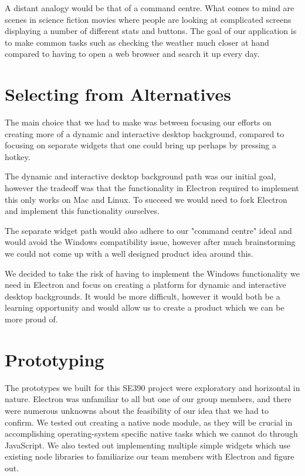 \documentclass[11pt, oneside]{article}   	%
\begin{document}
A distant analogy would be that of a command centre.  What comes to mind are
scenes in science fiction movies where people are looking at complicated screens
displaying a number of different stats and buttons.  The goal of our application
is to make common tasks such as checking the weather much closer at hand
compared to having to open a web browser and search it up every day.

\section{Selecting from Alternatives}
The main choice that we had to make was between focusing our efforts on creating
more of a dynamic and interactive desktop background, compared to focusing on
separate widgets that one could bring up perhaps by pressing a hotkey.

The dynamic and interactive desktop background path was our initial goal,
however the tradeoff was that the functionality in Electron required to
implement this only works on Mac and Linux.  To succeed we would need to fork
Electron and implement this functionality ourselves.

The separate widget path would also adhere to our "command centre" ideal and
would avoid the Windows compatibility issue, however after much brainstorming we
could not come up with a well designed product idea around this.

We decided to take the risk of having to implement the Windows functionality we
need in Electron and focus on creating a platform for dynamic and interactive
desktop backgrounds.  It would be more difficult, however it would both be a
learning opportunity and would allow us to create a product which we can be more
proud of.


\section{Prototyping}
The prototypes we built for this SE390 project were exploratory and horizontal
in nature.  Electron was unfamiliar to all but one of our group members, and
there were numerous unknowns about the feasibility of our idea that we had to
confirm.  We tested out creating a native node module, as they will be crucial
in accomplishing operating-system specific native tasks which we cannot do
through JavaScript.  We also tested out implementing multiple simple widgets
which use existing node libraries to familiarize our team members with Electron
and figure out.
\end{document}
